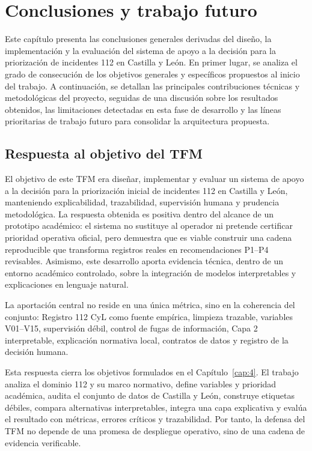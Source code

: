 \chapter{Conclusiones y trabajo futuro}
\label{cap:10}

Este capítulo presenta las conclusiones generales derivadas del diseño, la implementación y la evaluación del sistema de apoyo a la decisión para la priorización de incidentes 112 en Castilla y León. En primer lugar, se analiza el grado de consecución de los objetivos generales y específicos propuestos al inicio del trabajo. A continuación, se detallan las principales contribuciones técnicas y metodológicas del proyecto, seguidas de una discusión sobre los resultados obtenidos, las limitaciones detectadas en esta fase de desarrollo y las líneas prioritarias de trabajo futuro para consolidar la arquitectura propuesta.

\section{Respuesta al objetivo del TFM}

El objetivo de este TFM era diseñar, implementar y evaluar un sistema de apoyo a la
decisión para la priorización inicial de incidentes 112 en Castilla y León, manteniendo
explicabilidad, trazabilidad, supervisión humana y prudencia metodológica. La respuesta
obtenida es positiva dentro del alcance de un prototipo académico: el sistema no
sustituye al operador ni pretende certificar prioridad operativa oficial, pero demuestra
que es viable construir una cadena reproducible que transforma registros reales en
recomendaciones P1--P4 revisables. Asimismo, este desarrollo aporta evidencia técnica, dentro de un entorno académico controlado, sobre la integración de modelos interpretables y explicaciones en lenguaje natural.

La aportación central no reside en una única métrica, sino en la coherencia del conjunto:
Registro 112 CyL como fuente empírica, limpieza trazable, variables V01--V15,
supervisión débil, control de fugas de información, Capa 2 interpretable, explicación
normativa local, contratos de datos y registro de la decisión humana.

Esta respuesta cierra los objetivos formulados en el Capítulo~\ref{cap:4}. El trabajo
analiza el dominio 112 y su marco normativo, define variables y prioridad académica,
audita el conjunto de datos de Castilla y León, construye etiquetas débiles, compara alternativas interpretables,
integra una capa explicativa y evalúa el resultado con métricas, errores críticos y
trazabilidad. Por tanto, la defensa del TFM no depende de una promesa de despliegue
operativo, sino de una cadena de evidencia verificable.

